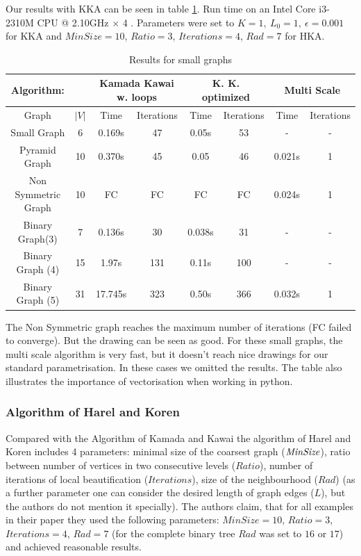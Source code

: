 \documentclass[12pt,a4paper]{article}
\begin{document}
Our results with KKA can be seen in table \ref{table: small}. Run time on an  Intel Core i3-2310M CPU @ 2.10GHz $\times$ 4 . Parameters were set to $K=1, \ L_0 = 1, \ \epsilon = 0.001$ for KKA and $MinSize=10$, $Ratio=3$, $Iterations=4$, $Rad = 7$ for HKA.
\begin{table}

\begin{tabular}{|c|c||c|c|c|c|c|c|}
\hline
Algorithm: & & \multicolumn{2}{|c|}{Kamada Kawai w. loops} &\multicolumn{2}{|c|}{K. K. optimized} &  \multicolumn{2}{|c|}{Multi Scale}  \\
\hline
\hline 
Graph & $|V|$ & Time & Iterations & Time & Iterations & Time & Iterations\\ 
\hline
Small Graph & 6 & 0.169s & 47& 0.05s & 53 &- & - \\ 
\hline 
Pyramid Graph & 10 & 0.370s & 45& 0.05& 46 &0.021s & 1  \\ 
\hline 
Non Symmetric Graph & 10 & FC  &FC & FC& FC & 0.024s & 1\\ 
\hline 
Binary Graph(3) & 7 & 0.136s & 30 & 0.038s& 31 & -&-\\ 
\hline 
Binary Graph (4) & 15 & 1.97s & 131 & 0.11s& 100 & -& - \\ 
\hline 
Binary Graph (5) & 31 & 17.745s & 323& 0.50s & 366 & 0.032s & 1 \\ 
\hline 
\end{tabular} 
\caption{Results for small graphs}
\label{table: small}
\end{table}
The Non Symmetric graph reaches the maximum number of iterations (FC failed to converge). But the drawing can be seen as good. For these small graphs, the multi scale algorithm is very fast, but it doesn't reach nice drawings for our standard parametrisation. In these cases we omitted the results.
The table also illustrates the importance of vectorisation when working in python.


\FloatBarrier 
\subsubsection*{Algorithm of Harel and Koren}

Compared with the Algorithm of Kamada and Kawai the algorithm of Harel and Koren includes 4 parameters: minimal size of the coarsest graph ($\it MinSize$), ratio between number of vertices in two consecutive levels ($Ratio$), number of iterations of local beautification ($Iterations$), size of the neighbourhood ($Rad$) (as a further parameter one can consider the desired length of graph edges ($L$), but the authors do not mention it specially). The authors claim, that for all examples in their paper they used the following parameters: $MinSize=10$, $Ratio=3$, $Iterations=4$, $Rad = 7$ (for the complete binary tree $Rad$ was set to $16$ or $17$) and achieved reasonable results.
\end{document}
